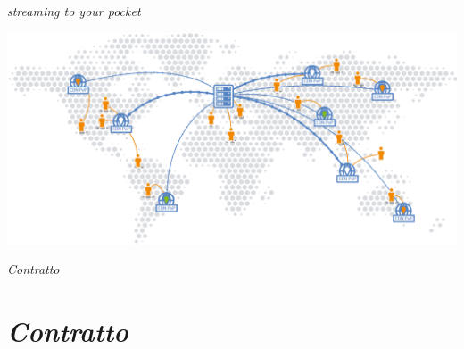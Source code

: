 \documentclass{article}
\author{Agosta, Belli, Emili, Giacchini, Luciani}
\begin{document}
\begin{center}
    \sffamily{\fontsize{50}{48} \selectfont \textcolor{red}{Nexi}\textcolor{green}{Fy}}
\end{center}

\begin{center}
    \itshape{\fontsize{20}{48} \selectfont streaming to your pocket}
\end{center}

\bigskip\bigskip\bigskip

\begin{flushleft}
    \includegraphics[scale=1]{../images/worldCDN.png}
\end{flushleft}

\bigskip\bigskip\bigskip

\begin{center}
    \itshape{\fontsize{30}{48} \selectfont Contratto}
\end{center}

\newpage
\printindex

\newpage
\section{\itshape{Contratto}}

\end{document}

